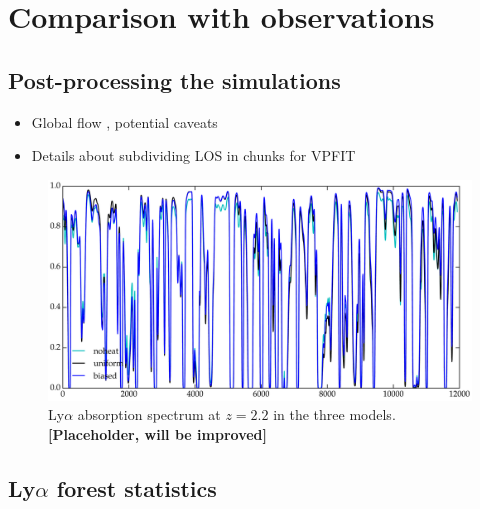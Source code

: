 \documentclass[numberedappendix]{emulateapj}
\newcommand\ALc[1]{{\color{red} \bf #1}} %
\begin{document}



\section{Comparison with observations}
\subsection{Post-processing the simulations}
\begin{itemize}
\item Global flow , potential caveats
\item Details about subdividing LOS in chunks for VPFIT
\end{itemize}

\begin{figure}[h]
\centering
\includegraphics[width = .8\textwidth ]{lines_z2_2}
\caption{Ly$\alpha$ absorption spectrum at $z=2.2$ in the three models. \ALc{[Placeholder, will be improved]}}
\label{fig:bias}
\end{figure}

\subsection{Ly$\alpha$ forest statistics}
\end{document}

